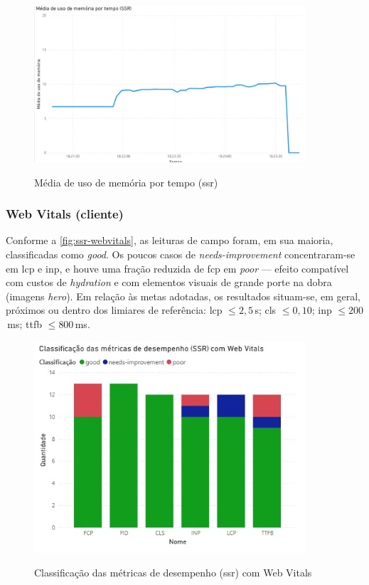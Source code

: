 \begin{figure}[H]
  \centering
  \caption{Média de uso de memória por tempo (\acrshort{ssr})}
  \includegraphics[width=0.9\textwidth]{media/uso_memoria_ssr.jpeg}
  \label{fig:ssr-mem}
\end{figure}

\subsubsection*{Web Vitals (cliente)}
Conforme a \autoref{fig:ssr-webvitals}, as leituras de campo foram, em sua maioria, classificadas como \textit{good}. Os poucos casos de \textit{needs-improvement} concentraram-se em \acrshort{lcp} e \acrshort{inp}, e houve uma fração reduzida de \acrshort{fcp} em \textit{poor} — efeito compatível com custos de \textit{hydration} e com elementos visuais de grande porte na dobra (imagens \emph{hero}). Em relação às metas adotadas, os resultados situam-se, em geral, próximos ou dentro dos limiares de referência: \acrshort{lcp} $\leq 2{,}5$\,s; \acrshort{cls} $\leq 0{,}10$; \acrshort{inp} $\leq 200$\,ms; \acrshort{ttfb} $\leq 800$\,ms.

\begin{figure}[H]
  \centering
  \caption{Classificação das métricas de desempenho (\acrshort{ssr}) com Web Vitals}
  \includegraphics[width=0.9\textwidth]{media/metricas_ssr_web_vitals.jpeg}
  \label{fig:ssr-webvitals}
\end{figure}

